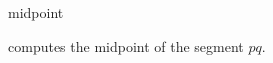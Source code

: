 \begin{ccRefFunction}{midpoint}

{computes the midpoint of the segment $pq$.}

\end{ccRefFunction}

